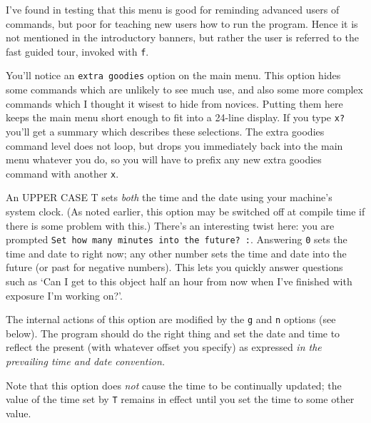 I've found in testing that this menu is good for reminding
advanced users of commands, but poor for teaching new users
how to run the program.  Hence it is not mentioned in the
introductory banners, but rather the user is referred to the
fast guided tour, invoked with {\tt f}.


You'll notice an {\tt extra goodies} option on the main
menu.  This option hides some commands which
are unlikely to see much use, and also some more complex
commands which I thought it wisest to hide from novices.
Putting them
here keeps the main menu short enough to fit into a 
24-line display.  If you
type {\tt x?} you'll get a summary which describes these
selections.  The extra goodies command level does not loop,
but drops you immediately back into the main
menu whatever you do, so you will have to prefix any new
extra goodies command with another {\tt x}.


An UPPER CASE T sets {\it both} the time and the date using your
machine's system clock.  (As noted earlier, this option 
may be switched off at compile time if there is some
problem with this.)  There's an interesting twist here:
you are prompted {\tt Set how many minutes into the future?  :}.
Answering {\tt 0} sets the time and date to right now;
any other number sets the time and date into the
future (or past for negative numbers).  This lets you 
quickly answer questions such
as  `Can I get to this object half an hour from now
when I've finished with exposure I'm working
on?'.

The internal actions of this option are modified by the
{\tt g} and {\tt n} options (see below).
The program should do the right thing and set
the date and time to reflect the present (with 
whatever offset you specify) as expressed {\it in the prevailing
time and date convention.}

Note that this option does {\it not} cause the time to be continually
updated; the value of the time set by {\tt T} remains in effect
until you set the time to some other value.


